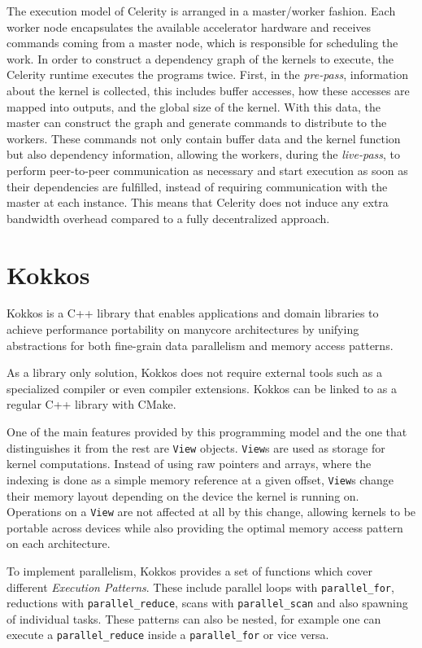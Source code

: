 The execution model of Celerity is arranged in a master/worker fashion. Each worker node encapsulates the available accelerator hardware and receives commands coming from a master node, which is responsible for scheduling the work. In order to construct a dependency graph of the kernels to execute, the Celerity runtime executes the programs twice. First, in the \textit{pre-pass}, information about the kernel is collected, this includes buffer accesses, how these accesses are mapped into outputs, and the global size of the kernel. With this data, the master can construct the graph and generate commands to distribute to the workers. These commands not only contain buffer data and the kernel function but also dependency information, allowing the workers, during the \textit{live-pass}, to perform peer-to-peer communication as necessary and start execution as soon as their dependencies are fulfilled, instead of requiring communication with the master at each instance. This means that Celerity does not induce any extra bandwidth overhead compared to a fully decentralized approach.

\section{Kokkos}
Kokkos \cite{kokkos} is a C++ library that enables applications and domain libraries to achieve performance portability on manycore architectures by unifying abstractions for both fine-grain data parallelism and memory access patterns.

As a library only solution, Kokkos does not require external tools such as a specialized compiler or even compiler extensions. Kokkos can be linked to as a regular C++ library with CMake.

One of the main features provided by this programming model and the one that distinguishes it from the rest are \texttt{View} objects. \texttt{View}s are used as storage for kernel computations. Instead of using raw pointers and arrays, where the indexing is done as a simple memory reference at a given offset, \texttt{View}s change their memory layout depending on the device the kernel is running on. Operations on a \texttt{View} are not affected at all by this change, allowing kernels to be portable across devices while also providing the optimal memory access pattern on each architecture.

To implement parallelism, Kokkos provides a set of functions which cover different \textit{Execution Patterns}. These include parallel loops with \texttt{parallel\_for}, reductions with \texttt{parallel\_reduce}, scans with \texttt{parallel\_scan} and also spawning of individual tasks. These patterns can also be nested, for example one can execute a \texttt{parallel\_reduce} inside a \texttt{parallel\_for} or vice versa.

